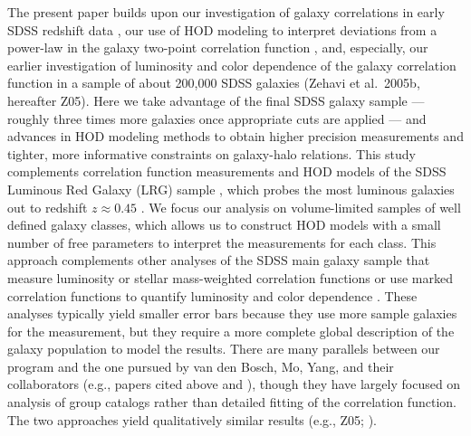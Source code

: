 \documentclass[]{emulateapj}
\begin{document}
The present paper builds upon our investigation of galaxy correlations
in early SDSS redshift data \citep{zehavi02}, our use of HOD modeling
to interpret deviations from a power-law in the galaxy two-point
correlation function \citep{zehavi04}, and, especially, our earlier
investigation of luminosity and color dependence of the galaxy 
correlation function in a sample of about 200,000 SDSS galaxies
(Zehavi et al.\ 2005b, hereafter Z05).
Here we take advantage of the final SDSS galaxy sample --- roughly
three times more galaxies once appropriate cuts are applied 
--- and advances
in HOD modeling methods to obtain higher precision measurements
and tighter, more informative constraints on galaxy-halo relations.
This study complements correlation function measurements and HOD models 
of the SDSS Luminous Red Galaxy (LRG) sample
\citep{eisenstein01,eisenstein05b,zehavi05a,zheng09,kazin10,watson10},
which probes the most luminous galaxies out to redshift
$z\approx 0.45$ \citep{eisenstein01}.
We focus our analysis on volume-limited samples of well defined galaxy
classes, which allows us to construct HOD models with a small number of
free parameters to interpret the measurements for each class.
This approach complements other analyses of the SDSS main galaxy
sample that measure luminosity or stellar mass-weighted correlation
functions \citep{li09,li10} or use marked correlation functions to 
quantify luminosity and color dependence \citep{skibba06,skibbasheth09}.
These analyses typically yield smaller error bars because they use
more sample galaxies for the measurement, but they require a more
complete global description of the galaxy population to model the results.
There are many parallels between our program and the 
one pursued by van den Bosch, Mo, Yang, and their collaborators
(e.g., papers cited above and 
\citealt{bosch03b,weinmann06,bosch07,yang08,more09}), 
though they have largely focused on analysis of group catalogs
\citep{yang05a,yang07} rather than detailed fitting of the correlation
function.  The two approaches yield qualitatively similar results 
(e.g., Z05; \citealt{yang05b,zheng07,yang08}).
\end{document}
